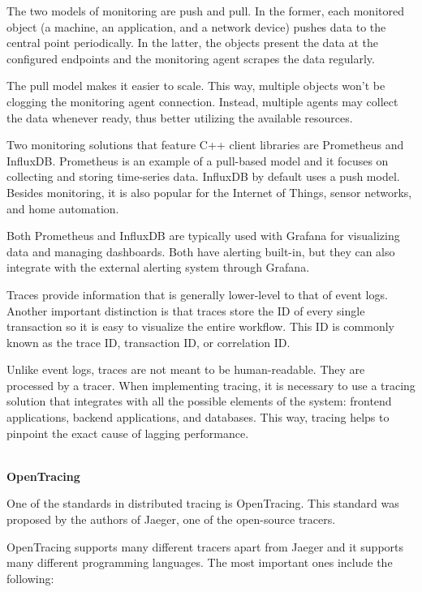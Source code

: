 The two models of monitoring are push and pull. In the former, each monitored object (a machine, an application, and a network device) pushes data to the central point periodically. In the latter, the objects present the data at the configured endpoints and the monitoring agent scrapes the data regularly.

The pull model makes it easier to scale. This way, multiple objects won't be clogging the monitoring agent connection. Instead, multiple agents may  collect the data whenever ready, thus better utilizing the available resources.

Two monitoring solutions that feature C++ client libraries are Prometheus and InfluxDB. Prometheus is an example of a pull-based model and it focuses on collecting and storing time-series data. InfluxDB by default uses a push model. Besides monitoring, it is also popular for the Internet of Things, sensor networks, and home automation.

Both Prometheus and InfluxDB are typically used with Grafana for visualizing data and managing dashboards. Both have alerting built-in, but they can also integrate with the external alerting system through Grafana.


Traces provide information that is generally lower-level to that of event logs. Another important distinction is that traces store the ID of every single transaction so it is easy to  visualize the entire workflow. This ID is commonly known as the trace ID, transaction ID, or correlation ID.

Unlike event logs, traces are not meant to be human-readable. They are processed by a tracer. When implementing tracing, it is necessary to use a tracing solution that integrates with all the possible elements of the system: frontend applications, backend applications, and databases. This way, tracing helps to pinpoint the exact cause of lagging performance.

\hspace*{\fill} \\ %
\noindent
\textbf{OpenTracing}

One of the standards in distributed tracing is OpenTracing. This standard was proposed by the authors of Jaeger, one of the open-source tracers.

OpenTracing supports many different tracers apart from Jaeger and it supports many different programming languages. The most important ones include the following:

